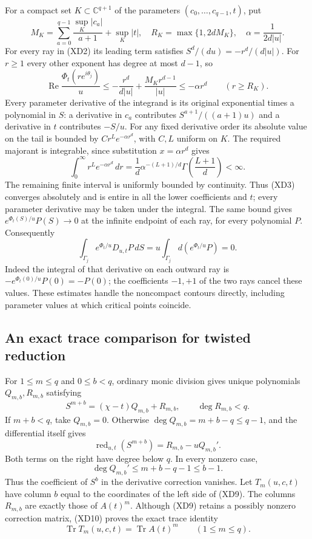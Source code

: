 \documentclass{article}
\begin{document}
For a compact set $K\subset\mathbb C^{q+1}$ of the parameters
$(c_0,\ldots,c_{q-1},t)$, put
\[
 M_K=\sum_{a=0}^{q-1}\frac{\sup_K|c_a|}{a+1}+\sup_K|t|,
 \quad R_K=\max\{1,2dM_K\},\quad\alpha=\frac1{2d|u|}.
 \tag{XD4}
\]
For every ray in (XD2) its leading term satisfies
$S^d/(du)=-r^d/(d|u|)$. For $r\geq1$ every other exponent
has degree at most $d-1$, so
\[
 \operatorname{Re}\frac{\Phi_t(re^{i\theta_j})}{u}
 \leq-\frac{r^d}{d|u|}+\frac{M_Kr^{d-1}}{|u|}
 \leq-\alpha r^d\qquad(r\geq R_K).
 \tag{XD5}
\]
Every parameter derivative of the integrand is its original exponential
times a polynomial in $S$: a derivative in $c_a$ contributes
$S^{a+1}/((a+1)u)$ and a derivative in $t$ contributes $-S/u$.
For any fixed derivative order its absolute value on the tail is
bounded by $Cr^L e^{-\alpha r^d}$, with $C,L$ uniform on $K$.
The required majorant is integrable, since substitution
$x=\alpha r^d$ gives
\[
 \int_0^\infty r^L e^{-\alpha r^d}\,dr
 =\frac1d\alpha^{-(L+1)/d}
    \Gamma\!\left(\frac{L+1}{d}\right)<\infty.
 \tag{XD6}
\]
The remaining finite interval is uniformly bounded by continuity.
Thus (XD3) converges absolutely and is entire in all the lower
coefficients and $t$; every parameter derivative may be taken under
the integral. The same bound gives
$e^{\Phi_t(S)/u}P(S)\longrightarrow0$ at the infinite endpoint
of each ray, for every polynomial $P$. Consequently
\[
 \int_{\Gamma_j}e^{\Phi_t/u}D_{u,t}P\,dS
 =u\int_{\Gamma_j}d(e^{\Phi_t/u}P)=0.
 \tag{XD7}
\]
Indeed the integral of that derivative on each outward ray is
$-e^{\Phi_t(0)/u}P(0)=-P(0)$; the coefficients $-1,+1$ of
the two rays cancel these values. These estimates handle the
noncompact contours directly, including parameter values at which
critical points coincide.

\subsection{An exact trace comparison for twisted reduction}

For $1\leq m\leq q$ and $0\leq b<q$, ordinary monic division gives
unique polynomials $Q_{m,b},R_{m,b}$ satisfying
\[
 S^{m+b}=(\chi-t)Q_{m,b}+R_{m,b},\qquad
 \deg R_{m,b}<q.
 \tag{XD8}
\]
If $m+b<q$, take $Q_{m,b}=0$. Otherwise
$\deg Q_{m,b}=m+b-q\leq q-1$, and the differential itself gives
\[
 \operatorname{red}_{u,t}(S^{m+b})
   =R_{m,b}-uQ_{m,b}'.
 \tag{XD9}
\]
Both terms on the right have degree below $q$. In every nonzero
case,
\[
 \deg Q_{m,b}'\leq m+b-q-1\leq b-1.
 \tag{XD10}
\]
Thus the coefficient of $S^b$ in the derivative correction vanishes.
Let $T_m(u,c,t)$ have column $b$ equal to the coordinates of the
left side of (XD9). The columns $R_{m,b}$ are exactly those of
$A(t)^m$. Although (XD9) retains a possibly nonzero correction
matrix, (XD10) proves the exact trace identity
\[
 \operatorname{Tr}T_m(u,c,t)=\operatorname{Tr}A(t)^m
       \qquad(1\leq m\leq q).
 \tag{XD11}
\]
\end{document}

